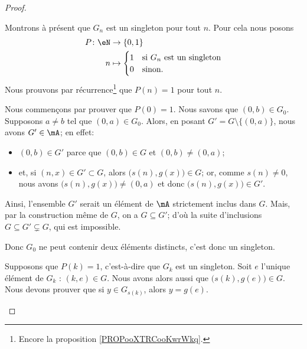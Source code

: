 \begin{proof}
\begin{subproof}
		Montrons à présent que \( G_n\) est un singleton pour tout \( n\). Pour cela nous posons
		\begin{equation}
			\begin{aligned}
				P\colon \eN & \to \{ 0,1 \}                                        \\
				n           & \mapsto \begin{cases}
					                      1 & \text{si }  G_n \text{ est un singleton} \\
					                      0 & \text{sinon. }
				                      \end{cases}
			\end{aligned}
		\end{equation}
		Nous prouvons par récurrence\footnote{Encore la proposition \ref{PROPooXTRCooKwrWkq}.} que \( P(n)=1\) pour tout \( n\).
		\begin{subproof}
			\spitem[\( P(0)=1\)]
			Nous commençons par prouver que \( P(0)=1\). Nous savons que \( (0,b)\in G_0\). Supposons \( a\neq b\) tel que \( (0,a)\in G_0\). Alors, en posant \( G'=G\setminus\{ (0,a) \}\), nous avons \( G'\in \mA\); en effet:
   			\begin{itemize}
	  			\item
	  				\( (0,b)\in G'\) parce que \( (0,b)\in G\) et \( (0,b)\neq (0,a)\);
	   			\item
	   				et, si \( (n,x) \in G' \subset G \), alors \( \big( s(n),g(x) \big)\in G\); or, comme \( s(n)\neq 0\), nous avons \( \big( s(n),g(x) \big)\neq (0,a)\) et donc \( \big( s(n),g(x) \big)\in G'\).
			\end{itemize}
			Ainsi, l'ensemble \( G'\) serait un élément de \( \mA\) strictement inclus dans \( G\). Mais, par la construction même de \( G \), on a \( G \subseteq G' \); d'où la suite d'inclusions \( G \subseteq G' \subsetneq G \), qui est impossible.
   
   			Donc \( G_0\) ne peut contenir deux éléments distincts, c'est donc un singleton.

			\spitem[Récurrence]
			Supposons que \( P(k)=1\), c'est-à-dire que \( G_k\) est un singleton. Soit \( e\) l'unique élément de \( G_k\) : \( (k,e)\in G\). Nous avons alors aussi que \( \big( s(k),g(e) \big)\in G\). Nous devons prouver que si \( y\in G_{s(k)}\), alors \( y=g(e)\).


\end{subproof}
\end{subproof}
\end{proof}
